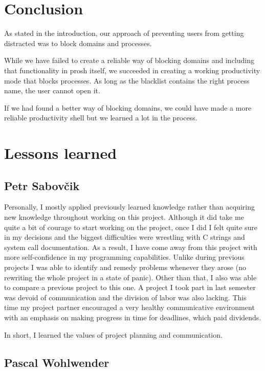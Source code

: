 \documentclass{article}
\begin{document}
\section{Conclusion}

As stated in the introduction, our approach of preventing users from getting distracted was to block domains and processes.

While we have failed to create a reliable way of blocking domains and including that functionality in prosh itself, we succeeded in creating a working productivity mode that blocks processes. As long as the blacklist contains the right process name, the user cannot open it.

If we had found a better way of blocking domains, we could have made a more reliable productivity shell but we learned a lot in the process.

\section{Lessons learned}
\subsection{Petr Sabovčik}

Personally, I mostly applied previously learned knowledge rather than acquiring new knowledge throughout working on this project. Although it did take me quite a bit of courage to start working on the project, once I did I felt quite sure in my decisions and the biggest difficulties were wrestling with C strings and system call documentation. As a result, I have come away from this project with more self-confidence in my programming capabilities. Unlike during previous projects I was able to identify and remedy problems whenever they arose (no rewriting the whole project in a state of panic). Other than that, I also was able to compare a previous project to this one. A project I took part in last semester was devoid of communication and the division of labor was also lacking. This time my project partner encouraged a very healthy communicative environment with an emphasis on making progress in time for deadlines, which paid dividends.

In short, I learned the values of project planning and communication.


\subsection{Pascal Wohlwender}
\end{document}
